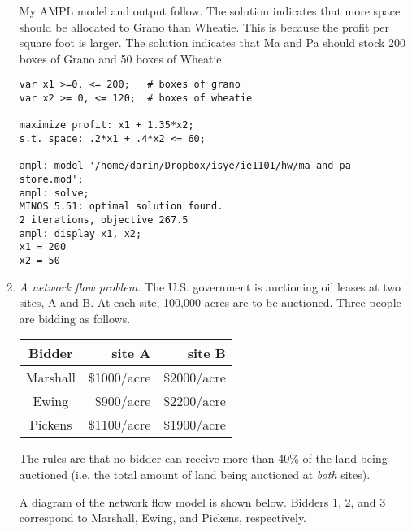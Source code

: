 \begin{enumerate}
\begin{solution}
\bs My AMPL model and output follow. The solution indicates that more
space should be allocated to Grano than Wheatie. This is because
the profit per square foot is larger. The solution indicates that
Ma and Pa should stock 200 boxes of Grano and 50 boxes of Wheatie.

\begin{Verbatim}[samepage=true]
var x1 >=0, <= 200;   # boxes of grano
var x2 >= 0, <= 120;  # boxes of wheatie

maximize profit: x1 + 1.35*x2;
s.t. space: .2*x1 + .4*x2 <= 60;

ampl: model '/home/darin/Dropbox/isye/ie1101/hw/ma-and-pa-store.mod';
ampl: solve;
MINOS 5.51: optimal solution found.
2 iterations, objective 267.5
ampl: display x1, x2;
x1 = 200
x2 = 50
\end{Verbatim}
\end{solution}

\item \emph{A network flow problem.}
The U.S. government is auctioning oil leases at two sites, A and B. At
each site, 100,000 acres are to be auctioned. Three people are bidding
as follows.

\begin{tabular}{crr}
Bidder & site A & site B \\ \hline
Marshall & \$1000/acre & \$2000/acre \\
Ewing     & \$900/acre & \$2200/acre \\
Pickens  & \$1100/acre & \$1900/acre
\end{tabular}

The rules are that no bidder can receive more than 40\% of the land
being auctioned (i.e. the total amount of land being auctioned at
\emph{both} sites).

\begin{solution}
  \bs A diagram of the network flow model is shown below. Bidders 1, 2,
  and 3 correspond to Marshall, Ewing, and Pickens, respectively.
\vspace{.2in}
\begin{center}
\begin{tikzpicture}[>=latex] %


\end{tikzpicture}
\end{center}
\end{solution}
\end{enumerate}
